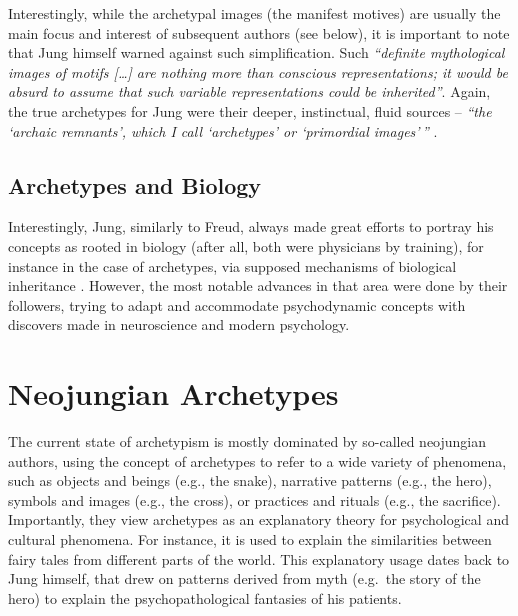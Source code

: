 \documentclass[
]{book}
\begin{document}
Interestingly, while the archetypal images (the manifest motives) are usually the main focus and interest of subsequent authors (see below), it is important to note that Jung himself warned against such simplification. Such \emph{``definite mythological images of motifs {[}\ldots{]} are nothing more than conscious representations; it would be absurd to assume that such variable representations could be inherited''}. Again, the true archetypes for Jung were their deeper, instinctual, fluid sources -- \emph{``the `archaic remnants', which I call `archetypes' or `primordial images'\,''} \citep{jung1964approaching}.

\hypertarget{archetypes-and-biology}{%
\subsection{Archetypes and Biology}\label{archetypes-and-biology}}

Interestingly, Jung, similarly to Freud, always made great efforts to portray his concepts as rooted in biology (after all, both were physicians by training), for instance in the case of archetypes, via supposed mechanisms of biological inheritance \citep[which is no longer supported by modern genetics modern genetics;][]{roesler2012archetypes}. However, the most notable advances in that area were done by their followers, trying to adapt and accommodate psychodynamic concepts with discovers made in neuroscience and modern psychology.

\hypertarget{neojungian-archetypes}{%
\section{Neojungian Archetypes}\label{neojungian-archetypes}}

The current state of archetypism is mostly dominated by so-called neojungian authors, using the concept of archetypes to refer to a wide variety of phenomena, such as objects and beings (e.g., the snake), narrative patterns (e.g., the hero), symbols and images (e.g., the cross), or practices and rituals (e.g., the sacrifice). Importantly, they view archetypes as an explanatory theory for psychological and cultural phenomena. For instance, it is used to explain the similarities between fairy tales from different parts of the world. This explanatory usage dates back to Jung himself, that drew on patterns derived from myth (e.g.~the story of the hero) to explain the psychopathological fantasies of his patients.
\end{document}
